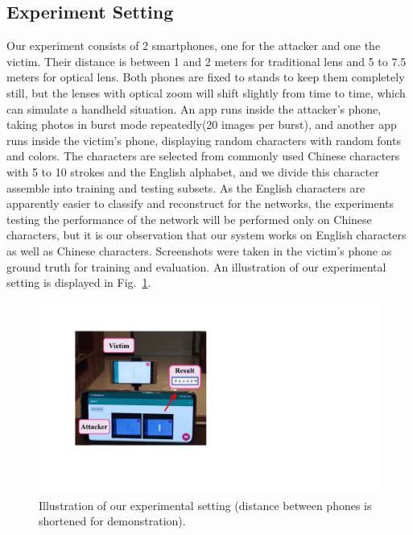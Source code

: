\subsection{Experiment Setting}
\label{sec-experiment-setting}
Our experiment consists of 2 smartphones, one for the attacker and one the victim. Their distance is between 1 and 2 meters for traditional lens and 5 to 7.5 meters for optical lens. Both phones are fixed to stands to keep them completely still, but the lenses with optical zoom will shift slightly from time to time, which can simulate a handheld situation. An app runs inside the attacker's phone, taking photos in burst mode repeatedly(20 images per burst), and another app runs inside the victim's phone, displaying random characters with random fonts and colors. The characters are selected from commonly used Chinese characters with 5 to 10 strokes and the English alphabet, and we divide this character assemble into training and testing subsets. As the English characters are apparently easier to classify and reconstruct for the networks, the experiments testing the performance of the network will be performed only on Chinese characters, but it is our observation that our system works on English characters as well as Chinese characters. Screenshots were taken in the victim's phone as ground truth for training and evaluation. An illustration of our experimental setting is displayed in Fig.~\ref{illustration_of_system}.
\begin{figure}
	\centering
	\includegraphics[width=0.80\linewidth]{pic/setup.pdf}
    \caption{Illustration of our experimental setting (distance between phones is shortened for demonstration).}
	\label{illustration_of_system}
\end{figure}

